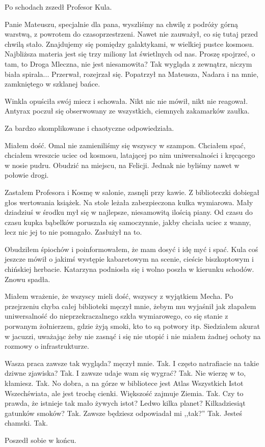 Po schodach zszedł Profesor Kula.
\begin{dialogue}
\ds{} Panie Mateuszu, specjalnie dla pana, wyszliśmy na chwilę z podróży górną warstwą, z powrotem do czasoprzestrzeni. \dm{} Nawet nie zauważył, co się tutaj przed chwilą stało.
\dm{} Znajdujemy się pomiędzy galaktykami,  w wielkiej pustce kosmosu. Najbliższa materia jest się trzy miliony lat świetlnych od nas. Proszę spojrzeć, 
o tam, to Droga Mleczna, nie jest niesamowita? Tak wygląda z zewnątrz, niczym biała spirala... \dm{} Przerwał, rozejrzał się. Popatrzył na Mateusza, Nadara i na mnie, zamkniętego w szklanej bańce.
\end{dialogue}

\divider{}

Winkla opuściła swój miecz i schowała. 
Nikt nic nie mówił, nikt nie reagował. 
Antyrax poczuł się obserwowany ze wszystkich, ciemnych zakamarków zaułka.
\begin{dialogue}
\ds{} Za bardzo skomplikowane i chaotyczne \dm{} odpowiedziała.
\end{dialogue}

\divider{}

Miałem dość. Omal nie zamieniliśmy się wszyscy w szampon.
Chciałem spać, chciałem wreszcie uciec od kosmosu, latającej po nim uniwersalności i kręcącego w nosie pudru.
Obudzić na miejscu, na Felicji.
Jednak nie byliśmy nawet w połowie drogi.

Zastałem Profesora i Kosmę w salonie, zasnęli przy kawie.
Z biblioteczki dobiegał głos wertowania książek.
Na stole leżała zabezpieczona kulka wymiarowa. Mały dziadziuś w środku mył się w najlepsze, niesamowitą ilością piany.
Od czasu do czasu kupka bąbelków poruszała się samoczynnie, jakby chciała uciec z wanny, lecz nic jej to nie pomagało.
Zasłużył na to.

Obudziłem śpiochów i poinformowałem, że mam dosyć i idę myć i spać.
Kula coś jeszcze mówił o jakimś występie kabaretowym na scenie, cieście biszkoptowym i chińskiej herbacie. 
Katarzyna podniosła się i wolno poszła w kierunku schodów.
Znowu spadła.

Miałem wrażenie, że wszyscy mieli dość, wszyscy z wyjątkiem Mecha.
Po przejrzeniu chyba całej biblioteki męczył mnie, żebym mu wyjaśnił jak złapałem uniwersalność do nieprzekraczalnego szkła wymiarowego,
co się stanie z porwanym żołnierzem, gdzie żyją smoki, kto to są potwory itp.
Siedziałem akurat w jacuzzi, uważając żeby nie zasnąć i się nie utopić i nie miałem żadnej ochoty na rozmowy o infrastrukturze.
\begin{dialogue}
\ds{} Wasza praca zawsze tak wygląda? \dm{} męczył mnie.
\ds{} Tak.
\ds{} I często natrafiacie na takie dziwne zjawiska?
\ds{} Tak.
\ds{} I zawsze udaje wam się wygrać?
\ds{} Tak.
\ds{} Nie wierzę w to, kłamiesz.
\ds{} Tak.
\ds{} No dobra, a na górze w bibliotece jest Atlas Wszystkich Istot Wszechświata, ale jest trochę cienki. Większość zajmuje Ziemia.
\ds{} Tak.
\ds{} Czy to prawda, że istnieje tak mało żywych istot? Ledwo kilka planet? Kilkadziesiąt gatunków smoków?
\ds{} Tak.
\ds{} Zawsze będziesz odpowiadał mi ,,tak?''
\ds{} Tak.
\ds{} Jesteś chamski.
\ds{} Tak.
\end{dialogue}
Poszedł sobie w końcu.

